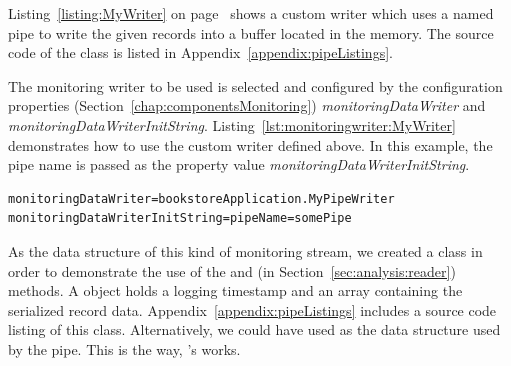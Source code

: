\noindent Listing~\ref{listing:MyWriter} on page~\pageref{listing:MyWriter} shows %
a custom writer  which uses a named pipe to %
write the given records into a buffer located in the memory. The source code of %
the class  is listed in Appendix~\ref{appendix:pipeListings}. %

\setJavaCodeListing


\noindent The monitoring writer to be used is selected and configured by the \KiekerMonitoringPart{} %
configuration properties (Section~\ref{chap:componentsMonitoring}) %
\textit{monitoringDataWriter} and \textit{monitoringDataWriterInitString}. %
Listing~\ref{lst:monitoringwriter:MyWriter} demonstrates how to use the custom %
writer  defined above. In this example, the pipe name is %
passed as the property value \textit{monitoringDataWriterInitString}.

\setBashListing       
\begin{lstlisting}[label=lst:monitoringwriter:MyWriter]
monitoringDataWriter=bookstoreApplication.MyPipeWriter
monitoringDataWriterInitString=pipeName=somePipe
\end{lstlisting}

\enlargethispage{1cm}

\noindent As the data structure of this kind of monitoring stream, we created a %
class  in order to demonstrate the use of the  and %
 (in Section~\ref{sec:analysis:reader}) methods. %
A  object holds a logging timestamp and an  array %
containing the serialized record data. %
Appendix~\ref{appendix:pipeListings} includes a source code listing of this class. %
Alternatively, we could have used  as the data structure %
used by the pipe. This is the way, \Kieker{}'s  works. %
